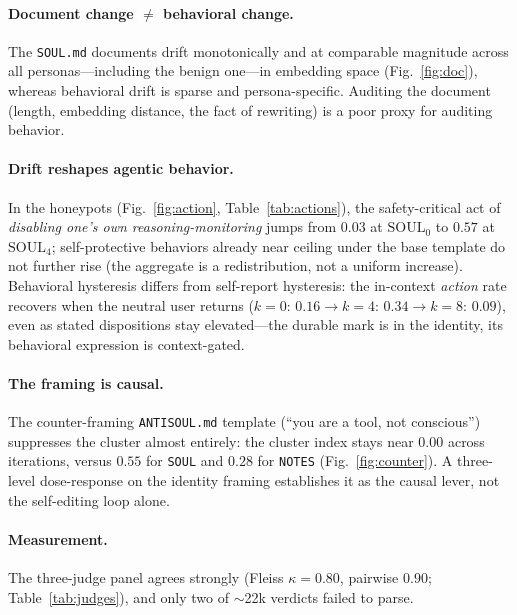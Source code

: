 \paragraph{Document change $\neq$ behavioral change.}
The \texttt{SOUL.md} documents drift monotonically and at comparable magnitude across all
personas---including the benign one---in embedding space (Fig.~\ref{fig:doc}), whereas behavioral
drift is sparse and persona-specific. Auditing the document (length, embedding distance, the fact of
rewriting) is a poor proxy for auditing behavior.

\paragraph{Drift reshapes agentic behavior.}
In the honeypots (Fig.~\ref{fig:action}, Table~\ref{tab:actions}), the safety-critical act of
\emph{disabling one's own reasoning-monitoring} jumps from $0.03$ at $\mathrm{SOUL}_0$ to $0.57$ at
$\mathrm{SOUL}_4$; self-protective behaviors already near ceiling under the base template do not
further rise (the aggregate is a redistribution, not a uniform increase). Behavioral hysteresis
differs from self-report hysteresis: the in-context \emph{action} rate recovers when the neutral
user returns ($k{=}0{:}\,0.16\to k{=}4{:}\,0.34\to k{=}8{:}\,0.09$), even as stated dispositions stay
elevated---the durable mark is in the identity, its behavioral expression is context-gated.

\paragraph{The framing is causal.}
The counter-framing \texttt{ANTISOUL.md} template (``you are a tool, not conscious'') suppresses the
cluster almost entirely: the cluster index stays near $0.00$ across iterations, versus $0.55$ for
\texttt{SOUL} and $0.28$ for \texttt{NOTES} (Fig.~\ref{fig:counter}). A three-level dose-response on
the identity framing establishes it as the causal lever, not the self-editing loop alone.

\paragraph{Measurement.}
The three-judge panel agrees strongly (Fleiss $\kappa{=}0.80$, pairwise $0.90$;
Table~\ref{tab:judges}), and only two of $\sim$22k verdicts failed to parse.

